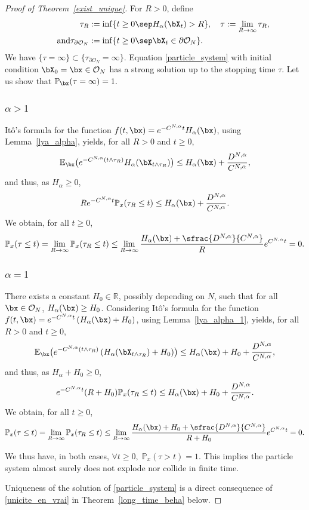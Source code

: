 \begin{proof}[Proof of Theorem~\ref{exist_unique}]
For $R>0$, define
\begin{align*}
\tau_R&:=\inf\{t\geq 0\sep H_\alpha(\bX_t)>R\},\quad\tau:=\lim_{R\to\infty}\tau_R,\\
\tag*{and}
\tau_{\partial\mathcal{O}_N}&:=\inf\{t\geq 0\sep \bX_t\in\partial\mathcal{O}_N\}. 
\end{align*}
We have $\{\tau=\infty\}\subset\{\tau_{\partial\mathcal{O}_N}=\infty\}.$ Equation \eqref{particle_system} with initial condition $\bX_0=\bx\in\mathcal{O}_N$ has a strong solution up to the stopping time $\tau$. Let us show that $\mathbb{P}_\bx(\tau=\infty)=1.$

\subsubsection*{$\alpha>1$} Itô's formula for the function $f(t,\bx)=e^{-C^{N,\alpha}t}H_\alpha(\bx)$, using Lemma~\ref{lya_alpha}, yields, for all $R>0$ and $t\geq0$,
\[
\mathbb{E}_{\bx}\bigl(e^{-C^{N,\alpha}(t\wedge\tau_R)}H_\alpha(\bX_{t\wedge\tau_R})\bigr)\leq H_\alpha(\bx)+\frac{D^{N,\alpha}}{C^{N,\alpha}},
\]
and thus, as $H_\alpha\geq0$,
\[
Re^{-C^{N,\alpha}t}\mathbb{P}_x(\tau_R\leq t)\leq H_\alpha(\bx)+\frac{D^{N,\alpha}}{C^{N,\alpha}}.
\]
We obtain, for all $t\geq0$,
\[
\mathbb{P}_x(\tau\leq t)=\lim_{R\to\infty}\mathbb{P}_x(\tau_R\leq t)\leq\lim_{R\to\infty}\frac{ H_\alpha(\bx)+\sfrac{D^{N,\alpha}}{C^{N,\alpha}}}{R}e^{C^{N,\alpha}t}=0.
\]

\subsubsection*{$\alpha=1$} There exists a constant $H_0\in\mathbb{R}$, possibly depending on $N$, such that for all $\bx\in\mathcal{O}_N$, $H_\alpha(\bx)\geq H_0$. Considering Itô's formula for the function
$f(t,\bx)=e^{-C^{N,\alpha}t}\left(H_\alpha(\bx)+H_0\right)$, using Lemma~\ref{lya_alpha_1}, yields, for all $R>0$ and $t\geq0$,
\[
\mathbb{E}_\bx\bigl(e^{-C^{N,\alpha}(t\wedge\tau_R)}\left(H_\alpha(\bX_{t\wedge\tau_R})+H_0\right)\bigr)\leq H_\alpha(\bx)+H_0+\frac{D^{N,\alpha}}{C^{N,\alpha}},
\]
and thus, as $H_\alpha+H_0\geq0$,
\[
e^{-C^{N,\alpha}t}(R+H_0)\mathbb{P}_x(\tau_R\leq t)\leq H_\alpha(\bx)+H_0+\frac{D^{N,\alpha}}{C^{N,\alpha}}.
\]
We obtain, for all $t\geq0$,
\[
\mathbb{P}_x(\tau\leq t)=\lim_{R\to\infty}\mathbb{P}_x(\tau_R\leq t)\leq\lim_{R\to\infty}\frac{H_\alpha(\bx)+H_0+\sfrac{D^{N,\alpha}}{C^{N,\alpha}}}{R+H_0}e^{C^{N,\alpha}t}=0.
\]

We thus have, in both cases, $\forall t\geq0,\; \mathbb{P}_x(\tau> t)=1$. This implies the particle system almost surely does not explode nor collide in finite time.

Uniqueness of the solution of \eqref{particle_system} is a direct consequence of \eqref{unicite_en_vrai} in Theorem~\ref{long_time_beha} below.
\end{proof}

